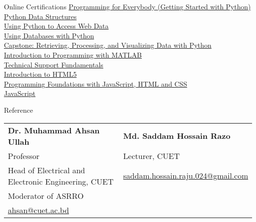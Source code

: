 \documentclass{article}
\newlength{\tabin}
\newlength{\secsep}
\newcommand{\lineunder}{\vspace*{-8pt} \\ \hspace*{-6pt} \hrulefill \\ \vspace*{-15pt}}
\newenvironment{tabbedsection}[1]{
  \begin{list}{}{
      \setlength{\itemsep}{0pt}
      \setlength{\labelsep}{0pt}
      \setlength{\labelwidth}{0pt}
      \setlength{\leftmargin}{\tabin}
      \setlength{\rightmargin}{\tabin}
      \setlength{\listparindent}{0pt}
      \setlength{\parsep}{0pt}
      \setlength{\parskip}{0pt}
      \setlength{\partopsep}{0pt}
      \setlength{\topsep}{#1}
    }
  \item[]
}{\end{list}}
\newenvironment{resume_section}[1]{
  \filbreak
  \vspace{2\secsep}
  \textsc{\large#1}
  \lineunder
  \begin{tabbedsection}{\secsep}
}{\end{tabbedsection}}
\begin{document}
  \begin{resume_section}{Online Certifications}
    \href{https://www.coursera.org/account/accomplishments/certificate/9DMFY8FUWW8A}{Programming for Everybody (Getting Started with Python)} \\
    \href{https://www.coursera.org/account/accomplishments/certificate/3V74VTE84SRX}{Python Data Structures} \\
    \href{https://www.coursera.org/account/accomplishments/certificate/BH5F6RJSHFU2}{Using Python to Access Web Data} \\
    \href{https://www.coursera.org/account/accomplishments/certificate/D4FVJZXPQ8EZ}{Using Databases with Python} \\
    \href{https://www.coursera.org/account/accomplishments/certificate/RG5VD3468YS6}{Capstone: Retrieving, Processing, and Visualizing Data with Python} \\
    \href{https://www.coursera.org/account/accomplishments/certificate/YTG2BAN3KX6Y}{Introduction to Programming with MATLAB} \\
    \href{https://www.coursera.org/account/accomplishments/certificate/4CNW2HNLEZJ9}{Technical Support Fundamentals} \\
    \href{https://www.coursera.org/account/accomplishments/certificate/7DZ7QDAGMY5Q}{Introduction to HTML5} \\
    \href{https://www.coursera.org/account/accomplishments/certificate/5CDPM75SN7NE}{Programming Foundations with JavaScript, HTML and CSS} \\
    \href{https://onemonth.com/certificates/ZxJJtGxVDtVtT2MeMyWk}{JavaScript}
  \end{resume_section}







\begin{resume_section}{Reference}
  \vspace{5px}
  \begin{tabularx}{\textwidth}{XX}
    \textbf{Dr. Muhammad Ahsan Ullah} & \textbf{Md. Saddam Hossain Razo} \\ 
    Professor & Lecturer, CUET \\
    Head of Electrical and Electronic Engineering, CUET & \href{mailto:saddam.hossain.raju.024@gmail.com}{saddam.hossain.raju.024@gmail.com} \\
    Moderator of ASRRO &  \\
    \href{mailto:ahsan@cuet.ac.bd}{ahsan@cuet.ac.bd} &
  
  \end{tabularx}
\end{resume_section}
\end{document}
